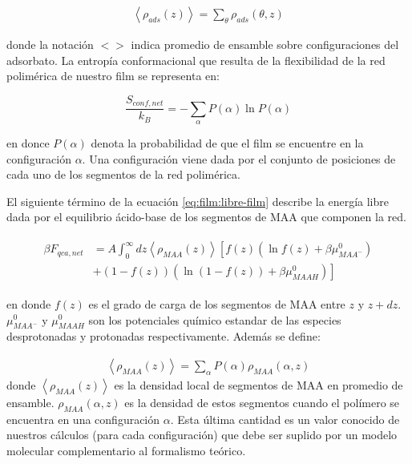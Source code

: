 \begin{align}
	\left<\rho_{ads}(z)\right> = \sum_\theta{\rho_{ads}(\theta,z)}
	\label{eq:film:ads-z-theta}
\end{align}

\noindent donde la notaci\'on $<>$ indica promedio de ensamble sobre configuraciones del adsorbato.
La entrop\'ia conformacional que resulta de la flexibilidad de la red polim\'erica de nuestro film se representa en:

\begin{equation}
	\frac{S_{conf,net}}{k_B} = - \sum_{\alpha}{P(\alpha)\ln P(\alpha)}
\end{equation}

\noindent en donce $P(\alpha)$ denota la probabilidad de que el film se encuentre en la configuraci\'on $\alpha$. Una configuraci\'on viene dada por el conjunto de posiciones de cada uno de los segmentos de la red polim\'erica. 

El siguiente t\'ermino de la ecuaci\'on \ref{eq:film:libre-film} describe  la energ\'ia libre dada por  el equilibrio \'acido-base de los segmentos de MAA que componen la red. 

\begin{align}
	\begin{aligned}
		\beta F_{qca,net} &= A\int_0^\infty dz \left<\rho_{MAA}(z)\right> \left[f(z)(\ln f(z)+ \beta\mu^0_{MAA^-})\right.\\
		&\left.+(1-f(z))(\ln (1-f(z))+\beta\mu^0_{MAAH})\right]    
	\end{aligned}
\end{align} 

\noindent en donde $f(z)$ es el grado de carga de los segmentos de MAA entre  $z$ y $z + dz$. 
$\mu^0_{MAA^-}$ y $\mu^0_{MAAH}$ son los potenciales qu\'imico estandar  de las especies  desprotonadas y protonadas respectivamente.
Adem\'as se define:

\begin{align}
	\left< \rho_{MAA}(z)\right> = \sum_\alpha{P(\alpha)\rho_{MAA}(\alpha,z)}
\end{align}
\noindent donde $\left< \rho_{MAA}(z)\right>$ es la densidad local de segmentos de MAA en promedio de ensamble. $\rho_{MAA}(\alpha,z)$ es la densidad de estos segmentos cuando el pol\'imero se encuentra en una configuraci\'on $\alpha$. Esta \'ultima cantidad es un valor conocido de nuestros c\'alculos (para cada configuraci\'on) que debe ser suplido por un modelo molecular complementario al formalismo te\'orico.


